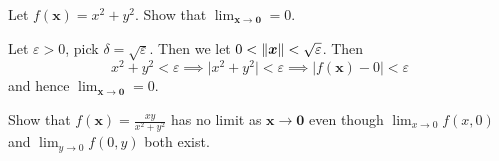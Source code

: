 \begin{example}
    Let $f(\bm x) = x^2 + y^2$. Show that $\lim_{\bm x \to \bm 0} = 0$.
\end{example}

\begin{solution}
    Let $\varepsilon > 0$, pick $\delta = \sqrt{\varepsilon}$. Then we let $0 < \left\lVert\bm x\right\rVert < \sqrt{\varepsilon}$. Then
    \[ x^2 + y^2 < \varepsilon \implies \lvert x^2 + y^2 \rvert < \varepsilon \implies \lvert f(\bm x) - 0 \rvert < \varepsilon \]
    and hence $\lim_{\bm x \to \bm 0} = 0$.
\end{solution}

\begin{example}
    Show that $f(\bm x) = \frac{xy}{x^2 + y^2}$ has no limit as $\bm x \to \bm 0$ even though $\lim_{x \to 0}f(x,0)$ and $\lim_{y\to 0}f(0, y)$ both exist.
\end{example}
